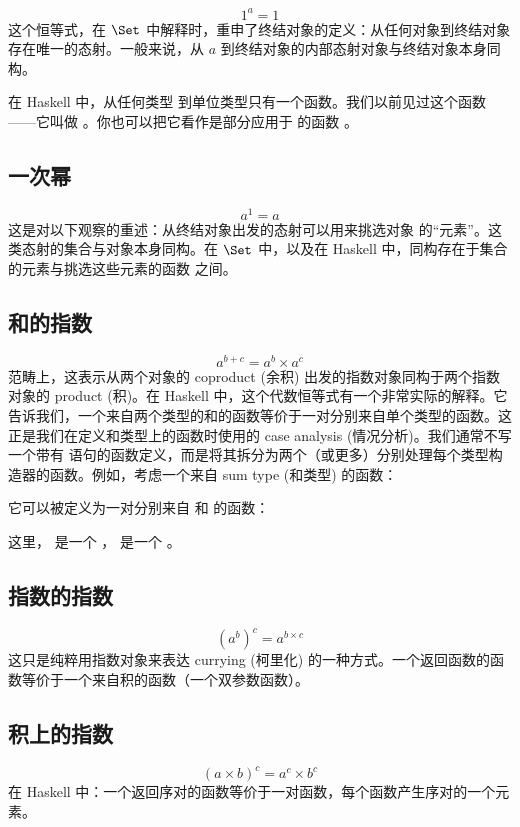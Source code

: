 \[1^{a} = 1\]
这个恒等式，在 $\Set$ 中解释时，重申了终结对象的定义：从任何对象到终结对象存在唯一的态射。一般来说，从 $a$ 到终结对象的内部态射对象与终结对象本身同构。

在 Haskell 中，从任何类型  到单位类型只有一个函数。我们以前见过这个函数——它叫做 。你也可以把它看作是部分应用于 \code{()} 的函数 。

\subsection{一次幂}

\[a^{1} = a\]
这是对以下观察的重述：从终结对象出发的态射可以用来挑选对象  的“元素”。这类态射的集合与对象本身同构。在 $\Set$ 中，以及在 Haskell 中，同构存在于集合  的元素与挑选这些元素的函数  之间。

\subsection{和的指数}

\[a^{b+c} = a^{b} \times a^{c}\]
范畴上，这表示从两个对象的 coproduct (余积) 出发的指数对象同构于两个指数对象的 product (积)。在 Haskell 中，这个代数恒等式有一个非常实际的解释。它告诉我们，一个来自两个类型的和的函数等价于一对分别来自单个类型的函数。这正是我们在定义和类型上的函数时使用的 case analysis (情况分析)。我们通常不写一个带有  语句的函数定义，而是将其拆分为两个（或更多）分别处理每个类型构造器的函数。例如，考虑一个来自 sum type (和类型)  的函数：

它可以被定义为一对分别来自  和  的函数：

这里， 是一个 ， 是一个 。

\subsection{指数的指数}

\[(a^{b})^{c} = a^{b \times c}\]
这只是纯粹用指数对象来表达 currying (柯里化) 的一种方式。一个返回函数的函数等价于一个来自积的函数（一个双参数函数）。

\subsection{积上的指数}

\[(a \times b)^{c} = a^{c} \times b^{c}\]
在 Haskell 中：一个返回序对的函数等价于一对函数，每个函数产生序对的一个元素。

